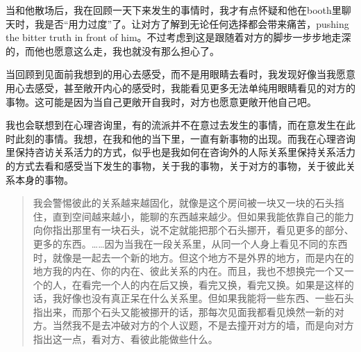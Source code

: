 当和他散场后，我在回顾一天下来发生的事情时，我才有点怀疑和他在booth里聊天时，我是否“用力过度”了。让对方了解到无论任何选择都会带来痛苦，pushing the bitter truth in front of him。不过考虑到这是跟随着对方的脚步一步步地走深的，而他也愿意这么走，我也就没有那么担心了。

\tristarsepline

当回顾到见面前我想到的用心去感受，而不是用眼睛去看时，我发现好像当我愿意用心去感受，甚至敞开内心的感受时，我能看见更多无法单纯用眼睛看见的对方的事物。这可能是因为当自己更敞开自我时，对方也愿意更敞开他自己吧。

我也会联想到在心理咨询里，有的流派并不在意过去发生的事情，而在意发生在此时此刻的事情。我想，在我和他的当下里，一直有新事物的出现。而我在心理咨询里保持咨访关系活力的方式，似乎也是我如何在咨询外的人际关系里保持关系活力的方式\pozhehao{}去看和感受当下发生的事物，关于我的事物，关于对方的事物，关于彼此关系本身的事物。

\blockquote{
	我会警惕彼此的关系越来越固化，就像是这个房间被一块又一块的石头挡住，直到空间越来越小，能聊的东西越来越少。但如果我能依靠自己的能力向你指出那里有一块石头，说不定就能把那个石头挪开，看见更多的部分、更多的东西。……因为当我在一段关系里，从同一个人身上看见不同的东西时，就像是一起去一个新的地方。但这个地方不是外界的地方，而是内在的地方\pozhehao{}我的内在、你的内在、彼此关系的内在。而且，我也不想换完一个又一个的人，在看完一个人的内在后又换，看完又换，看完又换。如果是这样的话，我好像也没有真正呆在什么关系里。但如果我能将一些东西、一些石头指出来，而那个石头又能被挪开的话，那每次见面我都看见焕然一新的对方。当然我不是去冲破对方的个人议题，不是去撞开对方的墙，而是向对方指出这一点，看对方、看彼此能做些什么。

}

